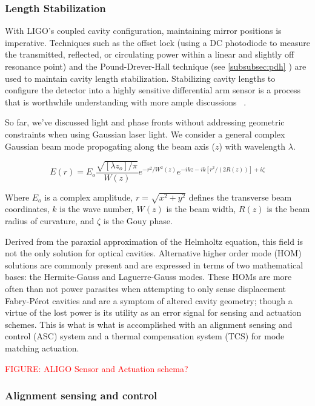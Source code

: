 {\subsubsection{Length Stabilization}
With LIGO's coupled cavity configuration, maintaining mirror positions is imperative. Techniques such as the offset lock (using a DC photodiode to measure the transmitted, reflected, or circulating power within a linear and slightly off resonance point) \cite{} and the Pound-Drever-Hall technique (see \ref{subsubsec:pdh} ) are used to maintain cavity length stabilization. Stabilizing cavity lengths to configure the detector into a highly sensitive differential arm sensor is a process that is worthwhile understanding with more ample discussions ~\cite{Mullavey:12}.


So far, we've discussed light and phase fronts without addressing geometric constraints when using Gaussian laser light. We consider a general complex Gaussian beam mode propogating along the beam axis ($z$) with wavelength $\lambda$.

\begin{equation}\label{eq:gaussian_beam}
E(r) = E_o \frac{\sqrt{[\lambda z_o] / \pi}}{W(z)}e^{-r^2 / W^2(z)} e^{-ikz - ik[r^2 / (2R(z))] + i \zeta}
\end{equation}

Where $E_o$ is a complex amplitude, $r = \sqrt{x^2 + y^2}$ defines the transverse beam coordinates, $k$ is the wave number, $W(z)$ is the beam width, $R(z)$ is the beam radius of curvature, and $\zeta$ is the Gouy phase.

Derived from the paraxial approximation of the Helmholtz equation, this field is not the only solution for optical cavities. Alternative higher order mode (HOM) solutions are commonly present and are expressed in terms of two mathematical bases: the Hermite-Gauss and Laguerre-Gauss modes. These HOMs are more often than not power parasites when attempting to only sense displacement Fabry-P\'{e}rot cavities and are a symptom of altered cavity geometry; though a virtue of the lost power is its utility as an error signal for sensing and actuation schemes. This is what is what is accomplished with an alignment sensing and control (ASC) system and a thermal compensation system (TCS) for mode matching actuation.

\textcolor{red}{FIGURE: ALIGO Sensor and Actuation schema?}

\subsubsection{Alignment sensing and control}

}
